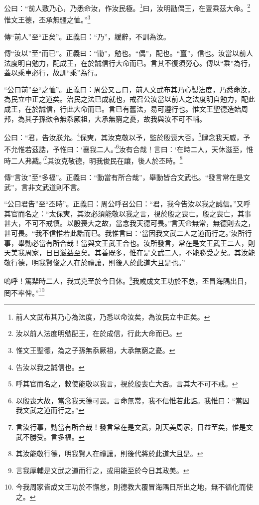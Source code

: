 公曰：“前人敷乃心，乃悉命汝，作汝民極。\footnote{前人文武布其乃心為法度，乃悉以命汝矣，為汝民立中正矣。}曰，汝明勖偶王，在亶乘茲大命。\footnote{汝以前人法度明勉配王，在於成信，行此大命而已。}惟文王德，丕承無疆之恤。”\footnote{惟文王聖德，為之子孫無忝厥祖，大承無窮之憂。}


{\noindent\zhuan{}\fzbyks 傳“前人”至“正矣”。正義曰：“乃”，緩辭，不訓為汝。 \par}

{\noindent\zhuan{}\fzbyks 傳“汝以”至“而已”。正義曰：“勖”，勉也。“偶”，配也。“亶”，信也。汝當以前人法度明自勉力，配成王，在於誠信行大命而已。言其不復須勞心。傳以“乘”為行，蓋以乘車必行，故訓“乘”為行。 \par}

{\noindent\shu{}\fzkt “公曰前”至“之恤”。正義曰：周公又言曰，前人文武布其乃心製法度，乃悉命汝，為民立中正之道矣。治民之法已成就也，戒召公汝當以前人之法度明自勉力，配此成王，在於誠信，行此大命而已。言已有舊法，易可遵行也。惟文王聖德造始周邦，為其子孫欲令無忝厥祖，大承無窮之憂，故我與汝不可不輔。 \par}

公曰：“君，告汝朕允。\footnote{告汝以我之誠信也。}保奭，其汝克敬以予，監於殷喪大否。\footnote{呼其官而名之，敕使能敬以我言，視於殷喪亡大否。言其大不可不戒。}肆念我天威，予不允惟若茲誥，予惟曰：‘襄我二人。’\footnote{以殷喪大故，當念我天德可畏。言命無常，我不信惟若此誥。我惟曰：“當因我文武之道而行之。”}汝有合哉！言曰：‘在時二人，天休滋至，惟時二人弗戡。’\footnote{言汝行事，動當有所合哉！發言常在是文武，則天美周家，日益至矣，惟是文武不勝受。言多福。}其汝克敬德，明我俊民在讓，後人於丕時。\footnote{其汝能敬行德，明我賢人在禮讓，則後代將於此道大且是。}


{\noindent\zhuan{}\fzbyks 傳“言汝”至“多福”。正義曰：“動當有所合哉”，舉動皆合文武也。“發言常在是文武”，言非文武道則不言。 \par}

{\noindent\shu{}\fzkt “公曰君告”至“丕時”。正義曰：周公呼召公曰：“君，我今告汝以我之誠信。”又呼其官而名之：“太保奭，其汝必須能敬以我之言，視於殷之喪亡。殷之喪亡，其事甚大，不可不戒慎。以殷喪大之故，當念我天德可畏。”言天命無常，無德則去之，甚可畏。“我不信惟若此誥而已。我惟言曰：‘當因我文武二人之道而行之。’汝所行事，舉動必當有所合哉！當與文王武王合也。汝所發言，常在是文王武王二人，則天美我周家，日日滋益至矣。其善既多，惟在是文武二人，不能勝受之矣。其汝能敬行德，明我賢俊之人在於禮讓，則後人於此道大且是也。” \par}

嗚呼！篤棐時二人，我式克至於今日休。\footnote{言我厚輔是文武之道而行之，或用能至於今日其政美。}我咸成文王功於不怠，丕冒海隅出日，罔不率俾。”\footnote{今我周家皆成文王功於不懈怠，則德教大覆冒海隅日所出之地，無不循化而使之。}

